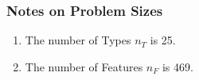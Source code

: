 \documentclass[aps,prl,twocolumn,superscriptaddress,groupedaddress]{revtex4}  %
\begin{document}
\subsubsection{Notes on Problem Sizes}

\begin{enumerate}
\item The number of Types $n_{T}$ is 25.
\item The number of Features $n_{F}$ is 469. 
\end{enumerate}


% 
% 
\end{document}
